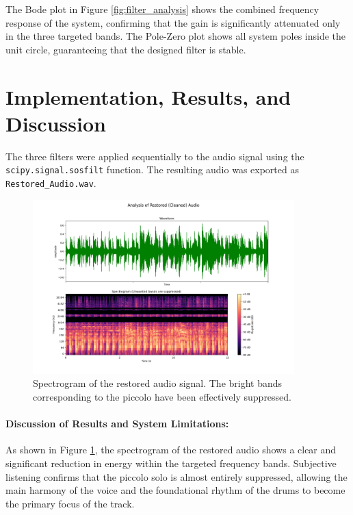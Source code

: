 \documentclass[11pt, a4paper]{article}
\begin{document}
The Bode plot in Figure \ref{fig:filter_analysis} shows the combined frequency response of the system, confirming that the gain is significantly attenuated only in the three targeted bands. The Pole-Zero plot shows all system poles inside the unit circle, guaranteeing that the designed filter is stable.

\section{Implementation, Results, and Discussion}
The three filters were applied sequentially to the audio signal using the \texttt{scipy.signal.sosfilt} function. The resulting audio was exported as \texttt{Restored\_Audio.wav}.

\begin{figure}[H]
    \centering
    \includegraphics[width=0.9\textwidth]{q2_part3_restored_analysis.png}
    \caption{Spectrogram of the restored audio signal. The bright bands corresponding to the piccolo have been effectively suppressed.}
    \label{fig:spec_restored}
\end{figure}

\paragraph{Discussion of Results and System Limitations:}
As shown in Figure \ref{fig:spec_restored}, the spectrogram of the restored audio shows a clear and significant reduction in energy within the targeted frequency bands. Subjective listening confirms that the piccolo solo is almost entirely suppressed, allowing the main harmony of the voice and the foundational rhythm of the drums to become the primary focus of the track.
\end{document}
